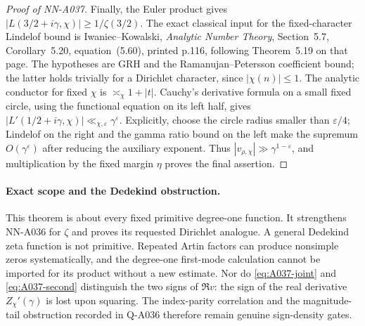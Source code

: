 \begin{proof}[Proof of NN-A037]
Finally, the Euler product gives
$|L(3/2+i\gamma,\chi)|\ge1/\zeta(3/2)$. The exact classical input
for the fixed-character Lindelof bound is Iwaniec--Kowalski,
\emph{Analytic Number Theory}, Section~5.7, Corollary~5.20,
equation~(5.60), printed p.116, following Theorem~5.19 on that page.
The hypotheses are GRH and the Ramanujan--Petersson coefficient
bound; the latter holds trivially for a Dirichlet character, since
$|\chi(n)|\le1$. The analytic conductor for fixed $\chi$ is
$\asymp_\chi 1+|t|$. Cauchy's derivative formula on a small
fixed circle, using the functional equation on its left half, gives
$|L'(1/2+i\gamma,\chi)|\ll_{\chi,\varepsilon}\gamma^\varepsilon$.
Explicitly, choose the circle radius smaller than $\varepsilon/4$;
Lindelof on the right and the gamma ratio bound on the left make the
supremum $O(\gamma^\varepsilon)$ after reducing the auxiliary exponent.
Thus $|v_{\rho,\chi}|\gg\gamma^{1-\varepsilon}$, and multiplication
by the fixed margin $\eta$ proves the final assertion.
\end{proof}

\paragraph{Exact scope and the Dedekind obstruction.}
This theorem is about every fixed primitive degree-one function. It
strengthens NN-A036 for $\zeta$ and proves its requested Dirichlet
analogue. A general Dedekind zeta function is not primitive. Repeated
Artin factors can produce nonsimple zeros systematically, and the
degree-one first-mode calculation cannot be imported for its product
without a new estimate. Nor do \eqref{eq:A037-joint} and
\eqref{eq:A037-second} distinguish the two signs of $\Re v$: the
sign of the real derivative $Z_\chi'(\gamma)$ is lost upon squaring.
The index-parity correlation and the magnitude-tail obstruction
recorded in Q-A036 therefore remain genuine sign-density gates.

